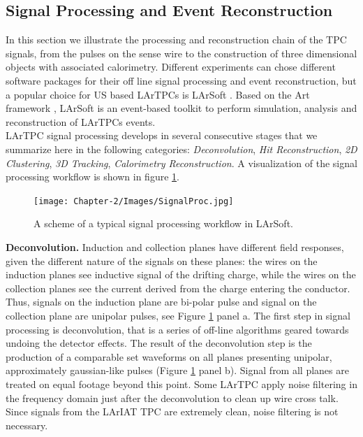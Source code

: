 \subsection{Signal Processing and Event Reconstruction}
In this section we illustrate the processing and reconstruction chain of the TPC signals, from the pulses on the sense wire to the construction of three dimensional objects with associated calorimetry. Different experiments can chose different software packages for their off line signal processing and event reconstruction, but  a popular choice for  US based  LArTPCs is LArSoft \cite{EricFChurck}. Based on the Art framework \cite{Green:2012gv}, LArSoft is an event-based toolkit to perform simulation, analysis and reconstruction of LArTPCs events.\\

LArTPC signal processing develops in several consecutive stages that we summarize here in the following categories: \emph{Deconvolution}, \emph{Hit Reconstruction}, \emph{2D Clustering}, \emph{3D Tracking}, \emph{Calorimetry Reconstruction}.  A visualization of the signal processing workflow is shown in figure \ref{fig:SignalProc}.\\

\begin{figure}[hbpt]
\centering
\texttt{[image: Chapter-2/Images/SignalProc.jpg]}
\caption{A scheme of a typical signal processing workflow in LArSoft.}
\label{fig:SignalProc}
\end{figure}

\textbf{Deconvolution.} Induction and collection planes have different field responses, given the different nature of the signals on these planes: the wires on the induction planes see inductive signal of the drifting charge, while the wires on the collection planes see the current derived from the charge entering the conductor. Thus, signals on the induction plane are bi-polar pulse and signal on the collection plane are unipolar pulses, see Figure \ref{fig:SignalProc} panel a. The first step in signal processing is deconvolution, that is a series of off-line algorithms geared towards undoing the detector effects. The result of the deconvolution step is  the production of  a comparable set waveforms on all planes presenting unipolar, approximately gaussian-like pulses (Figure \ref{fig:SignalProc} panel b). Signal from all planes are treated on equal footage beyond this point. Some LArTPC apply noise filtering in the frequency domain just after the deconvolution to clean up wire cross talk. Since signals from the LArIAT TPC are extremely clean, noise filtering is not necessary.\\


